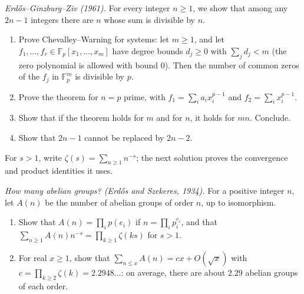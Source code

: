 \begin{exercise}[$\star\star$]\label{pb:egz}
\emph{Erdős--Ginzburg--Ziv (1961).} For every integer $n\ge1$, we show that among any $2n-1$ integers there are $n$ whose sum is divisible by $n$.
\begin{enumerate}[label=(\alph*)]
\item Prove Chevalley--Warning for systems: let $m\ge1$, and let $f_1,\dots,f_r\in\mathbb F_p[x_1,\dots,x_m]$ have degree bounds $d_j\ge0$ with $\sum_jd_j<m$ (the zero polynomial is allowed with bound $0$). Then the number
of common zeros of the $f_j$ in $\mathbb F_p^m$ is divisible by $p$.
\item Prove the theorem for $n=p$ prime, with $f_1=\sum_ia_ix_i^{p-1}$ and $f_2=\sum_ix_i^{p-1}$.
\item Show that if the theorem holds for $m$ and for $n$, it holds for $mn$. Conclude.
\item Show that $2n-1$ cannot be replaced by $2n-2$.
\end{enumerate}
\end{exercise}

For $s>1$, write $\zeta(s)=\sum_{n\ge1}n^{-s}$; the next solution proves the convergence and product identities it uses.

\begin{exercise}[$\star\star\star$]\label{pb:abelian}
\emph{How many abelian groups? (Erdős and Szekeres, 1934).} For a positive integer $n$, let $A(n)$ be the number of abelian groups of order $n$, up to isomorphism.
\begin{enumerate}[label=(\alph*)]
\item Show that $A(n)=\prod_ip(e_i)$ if $n=\prod_ip_i^{e_i}$, and that $\sum_{n\ge1}A(n)n^{-s}=\prod_{k\ge1}\zeta(ks)$ for $s>1$.
\item For real $x\ge1$, show that $\sum_{n\le x}A(n)=cx+O(\sqrt x)$ with $c=\prod_{k\ge2}\zeta(k)=2.2948\ldots$: on average, there are about $2.29$
abelian groups of each order.
\end{enumerate}
\end{exercise}

